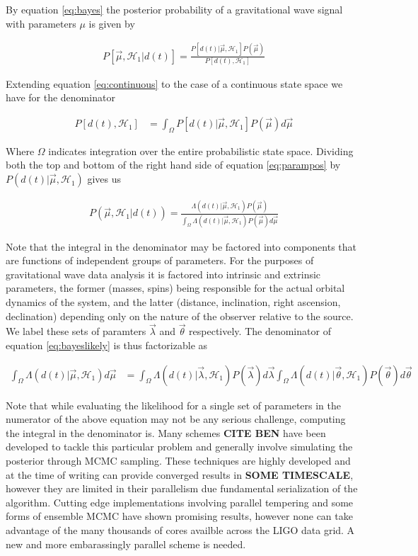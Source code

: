 \documentclass[paper=a4, fontsize=11pt]{scrartcl} %
\numberwithin{equation}{section} %
\numberwithin{figure}{section} %
\numberwithin{table}{section} %
\begin{document}
By equation \ref{eq:bayes}  the posterior probability of a gravitational wave signal with parameters $\mu$ is given by 

\begin{align}\label{eq:parampos}
P[\vec{\mu}, \mathcal{H}_1|d(t)] = \frac{P[d(t)|\vec{\mu}, \mathcal{H}_1]P(\vec{\mu})}{P[d(t), \mathcal{H}_1]}
\end{align}

Extending equation \ref{eq:continuous} to the case of a continuous state space we have for the denominator

\begin{align}
P[d(t), \mathcal{H}_1] &= \int_{\Omega}P[d(t)|\vec{\mu}, \mathcal{H}_1]P(\vec{\mu})d\vec{\mu}
\end{align}

Where $\Omega$ indicates integration over the entire probabilistic state space. Dividing both the top and bottom of the right hand side of equation \ref{eq:parampos} by $P(d(t)|\vec{\mu}, \mathcal{H}_1)$ gives us 

\begin{align}\label{eq:bayeslikely}
P(\vec{\mu}, \mathcal{H}_1|d(t)) = \frac{\Lambda(d(t)|\vec{\mu}, \mathcal{H}_1)P(\vec{\mu})}{\int_{\Omega}\Lambda(d(t)|\vec{\mu}, \mathcal{H}_1)P(\vec{\mu})d\vec{\mu}}
\end{align}

Note that the integral in the denominator may be factored into components that are functions of independent groups of parameters. For the purposes of gravitational wave data analysis it is factored into intrinsic and extrinsic parameters, the former (masses, spins) being responsible for the actual orbital dynamics of the system, and the latter (distance, inclination, right ascension, declination) depending only on the nature of the observer relative to the source. We label these sets of paramters $\vec{\lambda}$ and $\vec{\theta}$ respectively. The denominator of equation \ref{eq:bayeslikely} is thus factorizable as 

\begin{align}
\int_{\Omega}\Lambda(d(t)|\vec{\mu}, \mathcal{H}_1)d\vec{\mu} &= \int_{\Omega}\Lambda(d(t)|\vec{\lambda}, \mathcal{H}_1)P(\vec{\lambda})d\vec{\lambda}\int_{\Omega}\Lambda(d(t)|\vec{\theta}, \mathcal{H}_1)P(\vec{\theta})d\vec{\theta} 
\end{align} 

Note that while evaluating the likelihood for a single set of parameters in the numerator of the above equation may not be any serious challenge, computing the integral in the denominator is. Many schemes \textbf{CITE BEN} have been developed to tackle this particular problem and generally involve simulating the posterior through MCMC sampling. These techniques are highly developed and at the time of writing can provide converged results in \textbf{SOME TIMESCALE}, however they are limited in their parallelism due fundamental serialization of the algorithm. Cutting edge implementations involving parallel tempering and some forms of ensemble MCMC have shown promising results, however none can take advantage of the many thousands of cores availble across the LIGO data grid. A new and more embarassingly parallel scheme is needed.  
\end{document}
